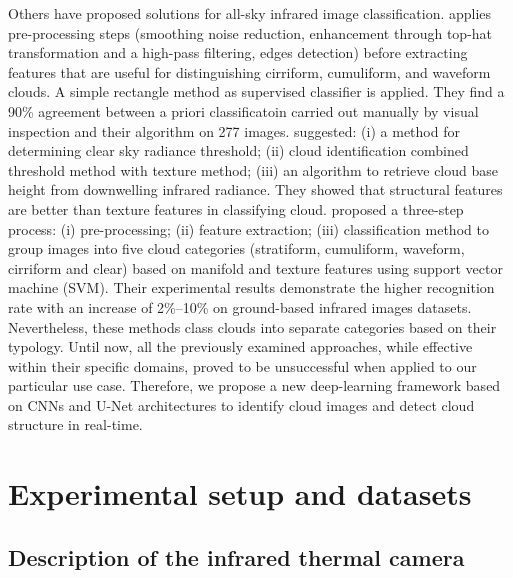 \documentclass[amt, article]{copernicus}
\begin{document}
Others have proposed solutions for all-sky infrared image classification.
\citet{Liu2021} applies pre-processing steps (smoothing noise reduction, enhancement through top-hat transformation and a high-pass filtering, edges detection) before extracting features that are useful for distinguishing cirriform, cumuliform, and waveform clouds. A simple rectangle method as supervised classifier is applied. They find a 90\% agreement between a priori classificatoin carried out manually by visual inspection and their algorithm on 277 images. \citet{SUN2011278} suggested: (i) a method for determining clear sky radiance threshold; (ii) cloud identification combined threshold method with texture method; (iii) an algorithm to retrieve cloud base height from downwelling infrared radiance. They showed that structural features are better than texture features in classifying cloud. \citet{amt-11-5351-2018} proposed a three-step process: (i) pre-processing; (ii) feature extraction; (iii) classification method to group images into five cloud categories (stratiform, cumuliform, waveform, cirriform and clear) based on manifold and texture features using support vector machine (SVM). Their experimental results demonstrate the higher recognition rate with an increase of 2\%–10\% on ground-based infrared images datasets. Nevertheless, these methods class clouds into separate categories based on their typology. Until now, all the previously examined approaches, while effective within their specific domains, proved to be unsuccessful when applied to our particular use case. Therefore, we propose a new deep-learning framework based on CNNs and U-Net architectures to identify cloud images and detect cloud structure in real-time.

\section{Experimental setup and datasets}

\subsection{Description of the infrared thermal camera}
\end{document}
